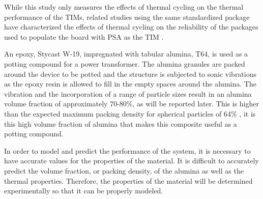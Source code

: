 While this study only measures the effects of thermal cycling on the thermal performance of the TIMs, related studies using the same standardized package have characterized the effects of thermal cycling on the reliability of the packages used to populate the board with PSA as the TIM \cite{Lall2006,Evans2008}.

An epoxy, Stycast W-19, impregnated with tabular alumina, T64, is used as a potting compound for a power transformer.  The alumina granules are packed around the device to be potted and the structure is subjected to sonic vibrations as the epoxy resin is allowed to fill in the empty spaces around the alumina. The vibration and the incorporation of a range of particle sizes result in an alumina volume fraction of approximately 70-80\%, as will be reported later.  This is higher than the expected maximum packing density for spherical particles of 64\% \cite{McGeary1961}, it is this high volume fraction of alumina that makes this composite useful as a potting compound.  

In order to model and predict the performance of the system, it is necessary to have accurate values for the properties of the material.  It is difficult to accurately predict the volume fraction, or packing density, of the alumina as well as the thermal properties.  Therefore, the properties of the material will be determined experimentally so that it can be properly modeled.

